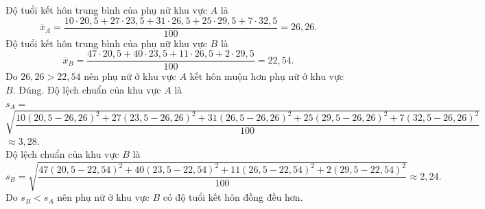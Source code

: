 \begin{ex}
{\begin{itemchoice}
			Độ tuổi kết hôn trung bình của phụ nữ khu vực $A$ là
			\[
			\overline{x}_A=
			\dfrac{10\cdot20{,}5+27\cdot23{,}5+31\cdot26{,}5+25\cdot29{,}5+7\cdot32{,}5}{100}
			=26{,}26.
			\]
			Độ tuổi kết hôn trung bình của phụ nữ khu vực $B$ là
			\[
			\overline{x}_B=
			\dfrac{47\cdot20{,}5+40\cdot23{,}5+11\cdot26{,}5+2\cdot29{,}5}{100}
			=22{,}54.
			\]
			Do
			$
			26{,}26>22{,}54
			$
			nên phụ nữ ở khu vực $A$ kết hôn muộn hơn phụ nữ ở khu vực $B$.
			\itemch Đúng.
			Độ lệch chuẩn của khu vực $A$ là\\
			$
			s_A=$\\
			$\sqrt{
				\dfrac{
					10(20{,}5-26{,}26)^2
					+27(23{,}5-26{,}26)^2
					+31(26{,}5-26{,}26)^2
					+25(29{,}5-26{,}26)^2
					+7(32{,}5-26{,}26)^2
				}{100}
			}$
		$
			\approx3{,}28.
			$\\			
			Độ lệch chuẩn của khu vực $B$ là
			\[
			s_B=
			\sqrt{
				\dfrac{
					47(20{,}5-22{,}54)^2
					+40(23{,}5-22{,}54)^2
					+11(26{,}5-22{,}54)^2
					+2(29{,}5-22{,}54)^2
				}{100}
			}
			\approx2{,}24.
			\]
			Do
			$
			s_B<s_A
			$
			nên phụ nữ ở khu vực $B$ có độ tuổi kết hôn đồng đều hơn.
		\end{itemchoice}
		}
	\end{ex}
	
